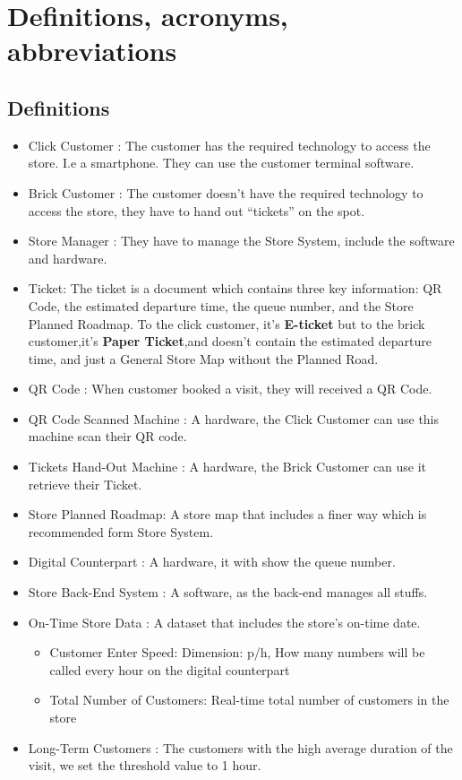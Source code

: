 \documentclass[a4paper,12pt]{book}
\begin{document}
\section{Definitions, acronyms, abbreviations}
\subsection{Definitions}\label{Definitions}
\begin{itemize}
	\item Click Customer : The customer has the required technology to access the store. I.e a smartphone. They can use the customer terminal software.
	\item Brick Customer : The customer doesn't have the required technology to access the store, they have to hand out “tickets” on the spot.
	\item Store Manager : They have to manage the Store System, include the software and hardware.
	\item Ticket: The ticket is a document which contains three key information: QR Code, the estimated departure time, the queue number, and the Store Planned Roadmap. To the click customer, it's \textbf{E-ticket} but to the brick customer,it's \textbf{Paper Ticket},and doesn't contain the estimated departure time, and just a General Store Map without the Planned Road.
	\item QR Code : When customer booked a visit, they will received a QR Code.
	\item QR Code Scanned Machine : A hardware, the Click Customer can use this machine scan their QR code.
	\item Tickets Hand-Out Machine : A hardware, the Brick Customer can use it retrieve their Ticket.
	\item Store Planned Roadmap: A store map that includes a finer way which is recommended form Store System.
	\item Digital Counterpart : A hardware, it with show the queue number.
	\item Store Back-End System : A software, as the back-end manages all stuffs.
	\item On-Time Store Data : A dataset that includes the store's on-time date.
	\begin{itemize}
		\item Customer Enter Speed: Dimension: p/h, How many numbers will be called every hour on the digital counterpart
		\item Total Number of Customers: Real-time total number of customers in the store
	\end{itemize}
	\item Long-Term Customers : The customers with the high average duration of the visit, we set the threshold value to 1 hour.
\end{itemize}
\end{document}
